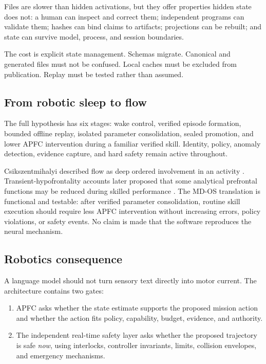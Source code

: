 \documentclass[10pt,twocolumn]{article}
\theoremstyle{definition}
\theoremstyle{plain}
\theoremstyle{remark}
\begin{document}
Files are slower than hidden activations, but they offer properties hidden state does not: a human can inspect and correct them; independent programs can validate them; hashes can bind claims to artifacts; projections can be rebuilt; and state can survive model, process, and session boundaries.

The cost is explicit state management.  Schemas migrate.  Canonical and generated files must not be confused.  Local caches must be excluded from publication.  Replay must be tested rather than assumed.

\subsection{From robotic sleep to flow}

The full hypothesis has six stages: wake control, verified episode formation, bounded offline replay, isolated parameter consolidation, sealed promotion, and lower APFC intervention during a familiar verified skill.  Identity, policy, anomaly detection, evidence capture, and hard safety remain active throughout.

Csikszentmihalyi described flow as deep ordered involvement in an activity \citep{csikszentmihalyi1975flow}.  Transient-hypofrontality accounts later proposed that some analytical prefrontal functions may be reduced during skilled performance \citep{dietrich2003hypofrontality,dietrich2004flow,ulrich2014flow,gold2021flow}.  The MD-OS translation is functional and testable: after verified parameter consolidation, routine skill execution should require less APFC intervention without increasing errors, policy violations, or safety events.  No claim is made that the software reproduces the neural mechanism.

\subsection{Robotics consequence}

A language model should not turn sensory text directly into motor current.  The architecture contains two gates:

\begin{enumerate}
  \item APFC asks whether the state estimate supports the proposed mission action and whether the action fits policy, capability, budget, evidence, and authority.
  \item The independent real-time safety layer asks whether the proposed trajectory is safe \emph{now}, using interlocks, controller invariants, limits, collision envelopes, and emergency mechanisms.
\end{enumerate}
\end{document}

